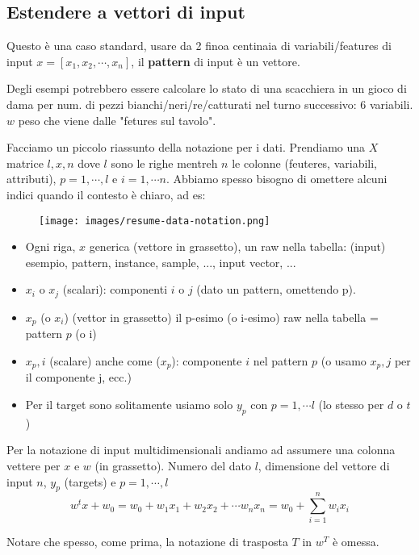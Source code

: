 \subsection{Estendere a vettori di input}
Questo è una caso standard, usare da 2 finoa centinaia di variabili/features di input  $x = [x_1, x_2, \cdots, x_n]$, il \textbf{pattern} di input
è un vettore.
\begin{example}
    Degli esempi potrebbero essere calcolare lo stato di una scacchiera in un gioco di dama per num. di pezzi bianchi/neri/re/catturati
    nel turno successivo: 6 variabili. $w$ peso che viene dalle "fetures sul tavolo".
\end{example}
\hspace{-15pt}Facciamo un piccolo riassunto della notazione per i dati. Prendiamo una $X$ matrice $l, x, n$ dove $l$ sono le righe
mentreh $n$ le colonne (feuteres, variabili, attributi), $p = 1, \cdots, l$ e $i = 1, \cdots n$. Abbiamo spesso bisogno di omettere alcuni
indici quando il contesto è chiaro, ad es:
\begin{figure}[h!]
    \centering
    \texttt{[image: images/resume-data-notation.png]}
\end{figure}
\begin{itemize}
    \item Ogni riga, $x$ generica (vettore in grassetto), un raw nella tabella: (input) esempio, pattern, instance, sample, ..., input vector, ...
    \item $x_i$ o $x_j$ (scalari): componenti $i$ o $j$ (dato un pattern, omettendo p).
    \item $x_p$ (o $x_i$) (vettor in grassetto) il p-esimo (o i-esimo) raw nella tabella = pattern $p$ (o i)
    \item $x_p,i$ (scalare) anche come ($x_p$): componente $i$ nel pattern $p$ (o usamo $x_p,j$ per il componente j, ecc.)
    \item Per il target sono solitamente usiamo solo $y_p$ con $p=1, \cdots l$ (lo stesso per $d$ o $t$)
\end{itemize}
Per la notazione di input multidimensionali andiamo ad assumere una colonna vettere per $x$ e $w$ (in grassetto). Numero 
del dato $l$, dimensione del vettore di input $n$, $y_p$ (targets) e $p = 1, \cdots, l$
$$w^t x + w_0 = w_0 + w_1 x_1 + w_2 x_2 + \cdots w_n x_n = w_0 + \sum_{i=1}^{n} w_i x_i$$
\begin{note}
    Notare che spesso, come prima, la notazione di trasposta $T$ in $w^T$ è omessa.
\end{note}
